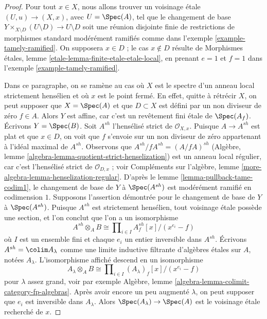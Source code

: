\begin{proof}
Pour tout $x \in X$, nous allons trouver un voisinage \'etale
$(U, u) \to (X, x)$, avec $U = \Spec(A)$, tel que le changement de base
$Y \times_{X \setminus D} (U \setminus D) \to U \setminus D$ soit une réunion disjointe finie de restrictions de morphismes standard
modérément ramifiés comme dans l'exemple \ref{example-tamely-ramified}.
On supposera $x \in D$ ; le cas $x \not \in D$ résulte de
Morphismes \'etales, lemme \ref{etale-lemma-finite-etale-etale-local},
en prenant $e = 1$ et $f = 1$ dans l'exemple \ref{example-tamely-ramified}.

\medskip\noindent
Dans ce paragraphe, on se ramène au cas où $X$ est le spectre d'un
anneau local strictement hensélien et où $x$ est le point fermé. En effet, quitte à rétrécir
$X$, on peut supposer que $X = \Spec(A)$ et que $D \subset X$ est défini par un
non diviseur de zéro $f \in A$. Alors $Y$ est affine, car c'est un revêtement fini
\'etale de $\Spec(A_f)$. Écrivons $Y = \Spec(B)$.
Soit $A^{sh}$ l'hensélisé strict de $\mathcal{O}_{X, x}$.
Puisque $A \to A^{sh}$ est plat et que $x \in D$, on voit que $f$ s'envoie
sur un non diviseur de zéro appartenant à l'idéal maximal de $A^{sh}$.
Observons que $A^{sh}/fA^{sh} = (A/fA)^{sh}$
(Algèbre, lemme \ref{algebra-lemma-quotient-strict-henselization})
est un anneau local régulier, car c'est l'hensélisé strict de $\mathcal{O}_{D, x}$ ;
voir Compléments sur l'algèbre, lemme \ref{more-algebra-lemma-henselization-regular}.
D'après le lemme \ref{lemma-pullback-tame-codim1},
le changement de base de $Y$ à $\Spec(A^{sh})$ est modérément ramifié en
codimension $1$. Supposons l'assertion démontrée pour le changement de base
de $Y$ à $\Spec(A^{sh})$. Puisque $A^{sh}$ est strictement hensélien, tout
voisinage \'etale possède une section, et l'on conclut que l'on a un isomorphisme
$$
A^{sh} \otimes_A B \cong
\prod\nolimits_{i \in I} A^{sh}_f[x]/(x^{e_i} - f)
$$
où $I$ est un ensemble fini et chaque $e_i$ un entier inversible dans $A^{sh}$.
Écrivons $A^{sh} = \colim A_\lambda$ comme une limite inductive filtrante d'algèbres \'etales
sur $A$, notées $A_\lambda$. L'isomorphisme affiché
descend en un isomorphisme
$$
A_\lambda \otimes_A B \cong \prod\nolimits_{i \in I}
(A_\lambda)_f[x]/(x^{e_i} - f)
$$
pour $\lambda$ assez grand, voir par exemple
Algèbre, lemme \ref{algebra-lemma-colimit-category-fp-algebras}.
Après avoir encore un peu augmenté $\lambda$,
on peut supposer que $e_i$ est inversible dans $A_\lambda$. Alors
$\Spec(A_\lambda) \to \Spec(A)$ est le voisinage \'etale recherché
de $x$.


\end{proof}
